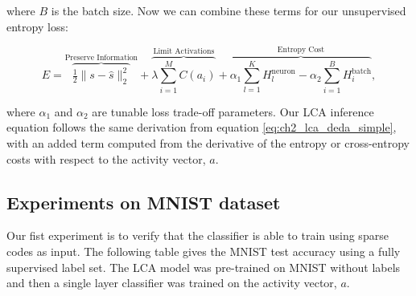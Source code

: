 \noindent where $B$ is the batch size. Now we can combine these terms for our unsupervised entropy loss:

\begin{equation}\label{eq:ch3_lcaf_unsupervised_energy}
         E =
        \overbrace{ \tfrac{1}{2} \| s - \hat{s} \|_{2}^{2} }^\text{Preserve Information} +
        \overbrace{ \lambda \sum\limits_{i=1}^{M}C(a_{i}) }^\text{Limit Activations} +
        \overbrace{ \alpha_{1} \sum\limits_{l=1}^{K} H^{\text{neuron}}_{l} - \alpha_{2} \sum\limits_{i=1}^{B}H^{\text{batch}}_{i}}^\text{Entropy Cost},
\end{equation}

\noindent where $\alpha_{1}$ and $\alpha_{2}$ are tunable loss trade-off parameters. Our LCA inference equation follows the same derivation from equation \eqref{eq:ch2_lca_deda_simple}, with an added term computed from the derivative of the entropy or cross-entropy costs with respect to the activity vector, $a$.


\subsection{Experiments on MNIST dataset}
Our fist experiment is to verify that the classifier is able to train using sparse codes as input. The following table gives the MNIST test accuracy using a fully supervised label set. The LCA model was pre-trained on MNIST without labels and then a single layer classifier was trained on the activity vector, $a$.


